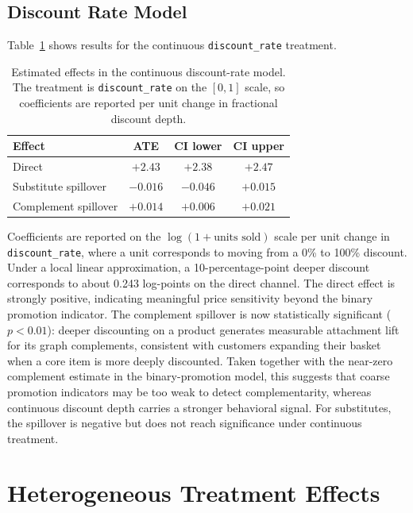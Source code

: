 \documentclass[conference]{IEEEtran}
\begin{document}
\subsection{Discount Rate Model}

Table~\ref{tab:discount} shows results for the continuous
\texttt{discount\_rate} treatment.

\begin{table}[ht]
    \centering
    \caption{Estimated effects in the continuous discount-rate model.
        The treatment is \texttt{discount\_rate} on the $[0,1]$ scale, so
        coefficients are reported per unit change in fractional discount depth.}
    \label{tab:discount}
    \begin{tabular}{lccc}
        \toprule
        Effect               & ATE      & CI lower & CI upper \\
        \midrule
        Direct               & $+2.43$  & $+2.38$  & $+2.47$  \\
        Substitute spillover & $-0.016$ & $-0.046$ & $+0.015$ \\
        Complement spillover & $+0.014$ & $+0.006$ & $+0.021$ \\
        \bottomrule
    \end{tabular}
\end{table}

Coefficients are reported on the $\log(1 + \text{units sold})$ scale per
unit change in \texttt{discount\_rate}, where a unit corresponds to moving
from a 0\% to 100\% discount.
Under a local linear approximation, a 10-percentage-point deeper discount
corresponds to about 0.243 log-points on the direct channel.
The direct effect is strongly positive, indicating meaningful price
sensitivity beyond the binary promotion indicator.
The complement spillover is now statistically significant ($p < 0.01$):
deeper discounting on a product generates measurable attachment lift for its
graph complements, consistent with customers expanding their basket when a
core item is more deeply discounted.
Taken together with the near-zero complement estimate in the binary-promotion
model, this suggests that coarse promotion indicators may be too weak to
detect complementarity, whereas continuous discount depth carries a stronger
behavioral signal.
For substitutes, the spillover is negative but does not reach significance
under continuous treatment.


\section{Heterogeneous Treatment Effects}
\end{document}
